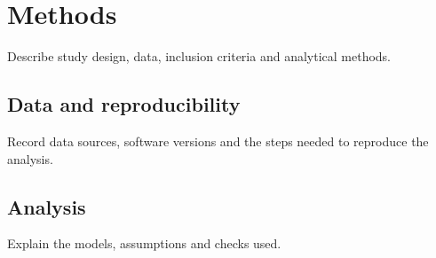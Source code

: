 \chapter{Methods}
\label{chap:methods}
Describe study design, data, inclusion criteria and analytical methods.
\section{Data and reproducibility}
Record data sources, software versions and the steps needed to reproduce the analysis.
\section{Analysis}
Explain the models, assumptions and checks used.

